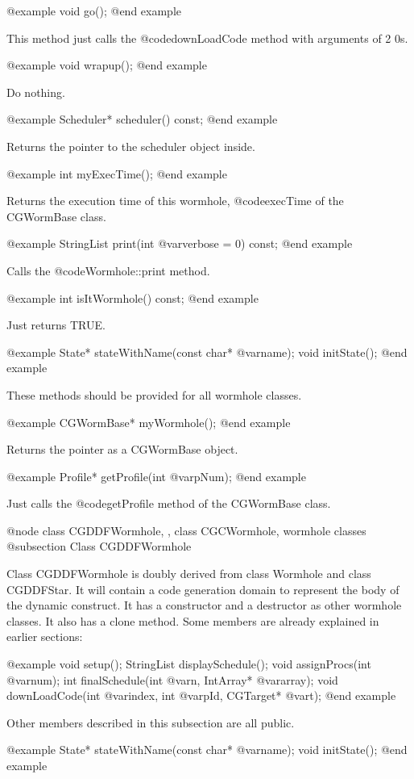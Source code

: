 {@example
void go();
@end example

This method just calls the @code{downLoadCode} method with arguments of 2 0s.

@example
void wrapup();
@end example

Do nothing.

@example
Scheduler* scheduler() const;
@end example

Returns the pointer to the scheduler object inside.

@example
int myExecTime();
@end example

Returns the execution time of this wormhole, @code{execTime} of the CGWormBase
class.

@example
StringList print(int @var{verbose} = 0) const;
@end example

Calls the @code{Wormhole::print} method.

@example
int isItWormhole() const;
@end example

Just returns TRUE.

@example
State* stateWithName(const char* @var{name});
void initState();
@end example

These methods should be provided for all wormhole classes.

@example
CGWormBase* myWormhole();
@end example

Returns the pointer as a CGWormBase object.

@example
Profile* getProfile(int @var{pNum});
@end example

Just calls the @code{getProfile} method of the CGWormBase class.

@node class CGDDFWormhole, , class CGCWormhole, wormhole classes
@subsection Class CGDDFWormhole

Class CGDDFWormhole is doubly derived from class Wormhole and class CGDDFStar.
It will contain a code generation domain to represent the body of the dynamic
construct. It has a constructor and a destructor as other wormhole classes. It
also has a clone method.
Some members are already explained in earlier sections:

@example
void setup();
StringList displaySchedule();
void assignProcs(int @var{num});
int finalSchedule(int @var{n}, IntArray* @var{array});
void downLoadCode(int @var{index}, int @var{pId}, CGTarget* @var{t});
@end example

Other members described in this subsection are all public.

@example
State* stateWithName(const char* @var{name});
void initState();
@end example

}
